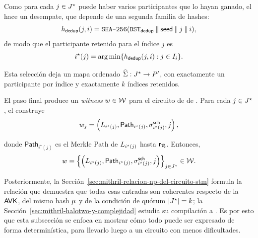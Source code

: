Como para cada $j \in J^{\star}$ puede haber varios participantes que lo hayan ganado, el \MithrilAggregator hace un desempate, que depende de una segunda familia de hashes:
$$h_{\mathsf{dedup}}(j,i) =
\texttt{SHA-256}(\texttt{DST}_{\mathsf{dedup}} \mathbin{\|} \mathsf{seed} \mathbin{\|} j \mathbin{\|} i),$$
de modo que el participante retenido para el índice $j$ es
$$i^{\star}(j) = \arg\min\{h_{\mathsf{dedup}}(j,i) : j \in I_i\}.$$

Esta selección deja un mapa ordenado $\widehat{\Sigma} : J^{\star} \to P'$, con exactamente un participante por índice y exactamente $k$ índices retenidos.

El paso final produce un \textit{witness} $w \in \mathcal{W}$ para el circuito de \HaloTwo de \Mithril. Para cada $j \in J^{\star}$, el \MithrilAggregator construye
$$w_j = \left(L_{i^{\star}(j)}, \mathsf{Path}_{i^{\star}(j)}, \sigma^{\mathsf{sch}}_{i^{\star}(j)}, j\right),$$

donde $\mathsf{Path}_{i^{\star}(j)}$ es el Merkle Path de $L_{i^{\star}(j)}$ hasta $\mathsf{r}_{\mathcal{R}}$. Entonces,
$$w =
\left\{\left(L_{i^{\star}(j)}, \mathsf{Path}_{i^{\star}(j)}, \sigma^{\mathsf{sch}}_{i^{\star}(j)}, j\right)\right\}_{j \in J^{\star}} \in \mathcal{W}.$$

Posteriormente, la Sección~\ref{sec:mithril-relacion-np-del-circuito-stm} formula la relación que demuestra que todas esas entradas son coherentes respecto de la $\mathsf{AVK}$, del mismo hash $\mu$ y de la condición de quórum $|J^{\star}| = k$; la Sección~\ref{sec:mithril-halotwo-y-complejidad} estudia su compilación a \HaloTwo. Es por esto que esta subsección se enfoca en mostrar cómo todo puede ser expresado de forma determinística, para llevarlo luego a un circuito con menos dificultades.
